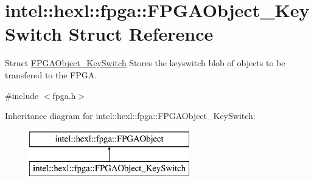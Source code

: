 \hypertarget{structintel_1_1hexl_1_1fpga_1_1FPGAObject__KeySwitch}{\section{intel\-:\-:hexl\-:\-:fpga\-:\-:F\-P\-G\-A\-Object\-\_\-\-Key\-Switch Struct Reference}
\label{structintel_1_1hexl_1_1fpga_1_1FPGAObject__KeySwitch}
}


Struct \hyperlink{structintel_1_1hexl_1_1fpga_1_1FPGAObject__KeySwitch}{F\-P\-G\-A\-Object\-\_\-\-Key\-Switch} Stores the keyswitch blob of objects to be transfered to the F\-P\-G\-A.  




{\ttfamily \#include $<$fpga.\-h$>$}

Inheritance diagram for intel\-:\-:hexl\-:\-:fpga\-:\-:F\-P\-G\-A\-Object\-\_\-\-Key\-Switch\-:\begin{figure}[H]
\begin{center}
\leavevmode
\includegraphics[height=2.000000cm]{structintel_1_1hexl_1_1fpga_1_1FPGAObject__KeySwitch}
\end{center}
\end{figure}
